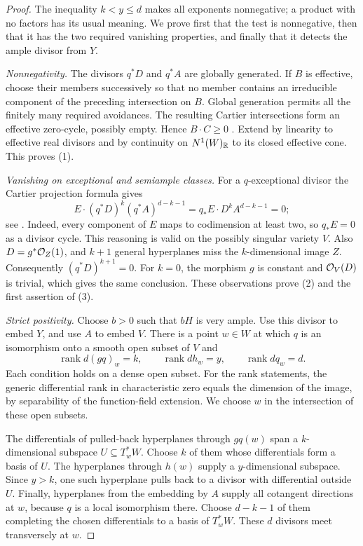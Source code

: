 \begin{proof}
The inequality $k<y\leq d$ makes all exponents nonnegative; a
product with no factors has its usual meaning. We prove first that
the test is nonnegative, then that it has the two required vanishing
properties, and finally that it detects the ample divisor from $Y$.

\smallskip\noindent
\emph{Nonnegativity.}
The divisors $q^*D$ and $q^*A$ are globally generated. If $B$ is
effective, choose their members successively so that no member
contains an irreducible component of the preceding intersection
on $B$. Global generation permits all the finitely many required
avoidances. The resulting Cartier intersections form an effective
zero-cycle, possibly empty. Hence $B\cdot C\geq0$
\cite[Chapter~2]{Fulton1998}. Extend by linearity to effective real
divisors and by continuity on $N^1(W)_\mathbb R$ to its closed effective
cone. This proves (1).

\smallskip\noindent
\emph{Vanishing on exceptional and semiample classes.}
For a $q$-exceptional divisor the Cartier projection formula gives
\begin{equation}\label{eq:exceptional-annihilation}
 E\cdot(q^*D)^k(q^*A)^{d-k-1}
   =q_*E\cdot D^kA^{d-k-1}=0;
\end{equation}
see \cite[Proposition~2.3(c)]{Fulton1998}.
Indeed, every component of $E$ maps to codimension at least two,
so $q_*E=0$ as a divisor cycle. This reasoning is valid on the
possibly singular variety $V$.
Also $D=g^*\mathcal O_Z(1)$, and $k+1$ general hyperplanes miss the
$k$-dimensional image $Z$. Consequently $(q^*D)^{k+1}=0$.
For $k=0$, the morphism $g$ is constant and $\mathcal O_V(D)$ is trivial,
which gives the same conclusion. These observations prove (2) and
the first assertion of (3).

\smallskip\noindent
\emph{Strict positivity.}
Choose $b>0$ such that $bH$ is very ample. Use this divisor to
embed $Y$, and use $A$ to embed $V$.
There is a point $w\in W$ at which $q$ is an isomorphism onto a
smooth open subset of $V$ and
\[
 \operatorname{rank}d(gq)_w=k,
 \qquad\operatorname{rank}dh_w=y,
 \qquad\operatorname{rank}dq_w=d.
\]
Each condition holds on a dense open subset. For the rank statements,
the generic differential rank in characteristic zero equals the
dimension of the image, by separability of the function-field
extension. We choose $w$ in the intersection of these open subsets.

The differentials of pulled-back hyperplanes through $gq(w)$ span
a $k$-dimensional subspace $U\subseteq T_w^*W$. Choose $k$ of them
whose differentials form a basis of $U$. The hyperplanes through
$h(w)$ supply a $y$-dimensional subspace. Since $y>k$, one such
hyperplane pulls back to a divisor with differential outside $U$.
Finally, hyperplanes from the embedding by $A$ supply all cotangent
directions at $w$, because $q$ is a local isomorphism there. Choose
$d-k-1$ of them completing the chosen differentials to a basis of
$T_w^*W$. These $d$ divisors meet transversely at $w$.


\end{proof}
